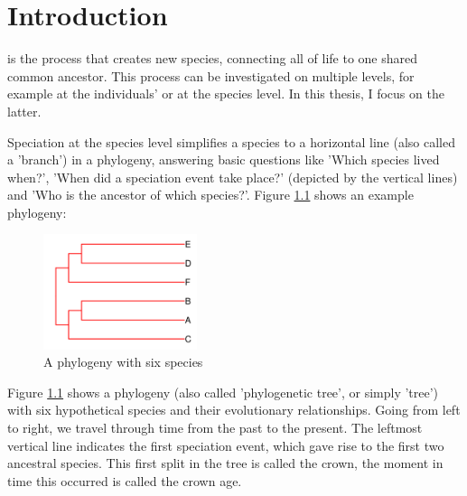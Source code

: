 \chapter{Introduction}
\label{chapter_introduction}


\newpage

\noindent 
{} is the process that creates new species,
connecting all of life to one shared common ancestor. This process
can be investigated on multiple levels, for example at the individuals'
or at the species level. In this thesis, I focus on the latter.

Speciation at the species level simplifies a species to a horizontal 
line (also called a 'branch') in a phylogeny, answering
basic questions like 'Which species lived when?', 'When did a speciation 
event take place?' (depicted by the vertical lines)
and 'Who is the ancestor of which species?'. 
Figure \ref{fig:phylogeny} shows an example phylogeny:

\begin{figure}[H]
  \includegraphics[width=0.4\textwidth]{phylogeny.png}
  \caption{
    A phylogeny with six species
  }
  \label{fig:phylogeny}
\end{figure}

Figure \ref{fig:phylogeny} shows a phylogeny (also called 'phylogenetic tree', 
or simply 'tree') with six hypothetical species and their evolutionary 
relationships. Going from left to right, we travel through time from 
the past to the present. 
The leftmost vertical line indicates the first speciation event, 
which gave rise to the first two ancestral species. 
This first split in the tree is called the crown,
the moment in time this occurred is called the crown age.

